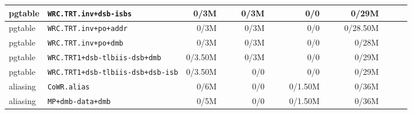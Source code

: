 \begin{tabular}{l l  | r r l | r r l | r r l | r r l l}
         pgtable &                                \verb|WRC.TRT.inv+dsb-isbs| &           0/3M &                       &                   &           0/3M &                       &                 &            0/0 &                       &                   &          0/29M &                       &                   & \\ \hline 
         pgtable &                                 \verb|WRC.TRT.inv+po+addr| &           0/3M &                       &                   &           0/3M &                       &                 &            0/0 &                       &                   &       0/28.50M &                       &                   & \\ \hline 
         pgtable &                                  \verb|WRC.TRT.inv+po+dmb| &           0/3M &                       &                   &           0/3M &                       &                 &            0/0 &                       &                   &          0/28M &                       &                   & \\ \hline 
         pgtable &                         \verb|WRC.TRT1+dsb-tlbiis-dsb+dmb| &        0/3.50M &                       &                   &           0/3M &                       &                 &            0/0 &                       &                   &          0/29M &                       &                   & \\ \hline 
         pgtable &                     \verb|WRC.TRT1+dsb-tlbiis-dsb+dsb-isb| &        0/3.50M &                       &                   &            0/0 &                       &                 &            0/0 &                       &                   &          0/29M &                       &                   & \\ \hline 
        aliasing &                                          \verb|CoWR.alias| &           0/6M &                       &                   &            0/0 &                       &                 &        0/1.50M &                       &                   &          0/36M &                       &                   & \\ \hline 
        aliasing &                                     \verb|MP+dmb-data+dmb| &           0/5M &                       &                   &            0/0 &                       &                 &        0/1.50M &                       &                   &          0/36M &                       &                   & \\ \hline 

\end{tabular}
